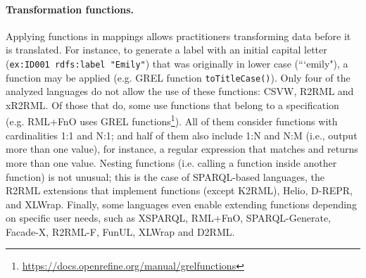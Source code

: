 \noindent\paragraph{\textbf{Transformation functions.}} Applying functions in mappings allows practitioners transforming data before it is translated. For instance, to generate a label with an initial capital letter (\texttt{ex:ID001 rdfs:label "Emily"}) that was originally in lower case (```emily"), a function may be applied (e.g. GREL function \texttt{toTi\-tleCase()}). Only four of the analyzed languages do not allow the use of these functions: CSVW, R2RML and xR2RML. Of those that do, some use functions that belong to a specification (e.g. RML+FnO uses GREL functions\footnote{\url{https://docs.openrefine.org/manual/grelfunctions}}). All of them consider functions with cardinalities 1:1 and N:1; and half of them also include 1:N and N:M (i.e., output more than one value), for instance, a regular expression that matches and returns more than one value.  Nesting functions (i.e. calling a function inside another function) is not unusual; this is the case of SPARQL-based languages, the R2RML extensions that implement functions (except K2RML), Helio, D-REPR, and XLWrap. Finally, some languages even enable extending functions depending on specific user needs, such as XSPARQL, RML+FnO, SPARQL-Generate, Facade-X, R2RML-F, FunUL, XLWrap and D2RML.


